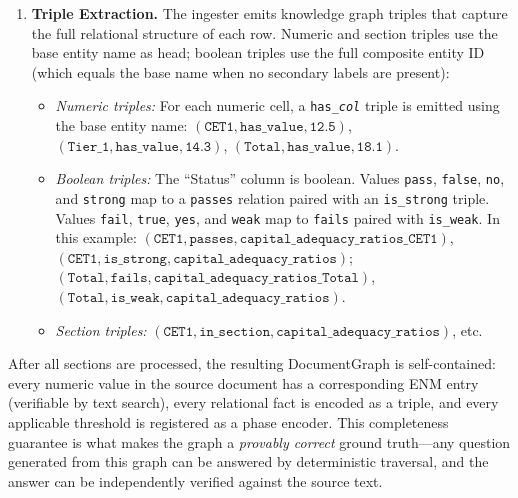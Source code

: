 \documentclass[11pt]{article}
\begin{document}
\begin{enumerate}[leftmargin=2em]
  For tables with multiple numeric columns (e.g., columns AUC,
  Precision, Recall), the column name is appended to form a composite
  key: $(\texttt{type},\; \texttt{Entity/Column})$.  Tables with
  secondary label columns (e.g., Scenario and Quarter) produce
  keys such as $\texttt{Baseline/Q1\,2026/CET1}$.

\item \textbf{Triple Extraction.}
  The ingester emits knowledge graph triples that capture the full
  relational structure of each row.  Numeric and section triples use the
  base entity name as head; boolean triples use the full composite entity
  ID (which equals the base name when no secondary labels are present):
  \begin{itemize}[leftmargin=1.5em]
    \item \emph{Numeric triples:}
      For each numeric cell, a \texttt{has\_\textit{col}} triple is
      emitted using the base entity name:
      $(\texttt{CET1}, \texttt{has\_value}, \texttt{12.5})$,
      $(\texttt{Tier\_1}, \texttt{has\_value}, \texttt{14.3})$,
      $(\texttt{Total}, \texttt{has\_value}, \texttt{18.1})$.
    \item \emph{Boolean triples:}  The ``Status'' column is boolean.
      Values \texttt{pass}, \texttt{false}, \texttt{no}, and
      \texttt{strong} map to a \texttt{passes} relation paired with
      an \texttt{is\_strong} triple.  Values \texttt{fail},
      \texttt{true}, \texttt{yes}, and \texttt{weak} map to
      \texttt{fails} paired with \texttt{is\_weak}.  In this example:
      $(\texttt{CET1}, \texttt{passes}, \texttt{capital\_adequacy\_ratios\_CET1})$,
      $(\texttt{CET1}, \texttt{is\_strong}, \texttt{capital\_adequacy\_ratios})$;
      $(\texttt{Total}, \texttt{fails}, \texttt{capital\_adequacy\_ratios\_Total})$,
      $(\texttt{Total}, \texttt{is\_weak}, \texttt{capital\_adequacy\_ratios})$.
    \item \emph{Section triples:}
      $(\texttt{CET1}, \texttt{in\_section}, \texttt{capital\_adequacy\_ratios})$, etc.
  \end{itemize}
\end{enumerate}

\noindent
After all sections are processed, the resulting DocumentGraph is
self-contained: every numeric value in the source document has a
corresponding ENM entry (verifiable by text search), every
relational fact is encoded as a triple, and every applicable
threshold is registered as a phase encoder.  This completeness
guarantee is what makes the graph a \emph{provably correct} ground
truth---any question generated from this graph can be answered by
deterministic traversal, and the answer can be independently verified
against the source text.
\end{document}
